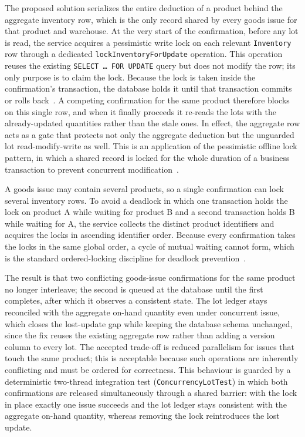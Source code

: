 The proposed solution serializes the entire deduction of a product behind the
aggregate inventory row, which is the only record shared by every goods issue
for that product and warehouse. At the very start of the confirmation, before
any lot is read, the service acquires a pessimistic write lock on each
relevant \texttt{Inventory} row through a dedicated
\texttt{lockInventoryForUpdate} operation. This operation reuses the existing
\texttt{SELECT~\dots~FOR~UPDATE} query but does not modify the row; its only
purpose is to claim the lock. Because the lock is taken inside the
confirmation's transaction, the database holds it until that transaction
commits or rolls back~\cite{postgresql14}. A competing confirmation for the
same product therefore blocks on this single row, and when it finally proceeds
it re-reads the lots with the already-updated quantities rather than the stale
ones. In effect, the aggregate row acts as a gate that protects not only the
aggregate deduction but the unguarded lot read-modify-write as well. This is an
application of the pessimistic offline lock pattern, in which a shared record is
locked for the whole duration of a business transaction to prevent concurrent
modification~\cite{fowler2002poeaa, bauer2015hibernate}.

A goods issue may contain several products, so a single confirmation can lock
several inventory rows. To avoid a deadlock in which one transaction holds the
lock on product A while waiting for product B and a second transaction holds B
while waiting for A, the service collects the distinct product identifiers and
acquires the locks in ascending identifier order. Because every confirmation
takes the locks in the same global order, a cycle of mutual waiting cannot
form, which is the standard ordered-locking discipline for deadlock
prevention~\cite{fowler2002poeaa}.

The result is that two conflicting goods-issue confirmations for the same
product no longer interleave; the second is queued at the database until the
first completes, after which it observes a consistent state. The lot ledger
stays reconciled with the aggregate on-hand quantity even under concurrent
issue, which closes the lost-update gap while keeping the database schema
unchanged, since the fix reuses the existing aggregate row rather than adding a
version column to every lot. The accepted trade-off is reduced parallelism for
issues that touch the same product; this is acceptable because such operations
are inherently conflicting and must be ordered for correctness. This behaviour
is guarded by a deterministic two-thread integration test
(\texttt{ConcurrencyLotTest}) in which both confirmations are released
simultaneously through a shared barrier: with the lock in place exactly one
issue succeeds and the lot ledger stays consistent with the aggregate on-hand
quantity, whereas removing the lock reintroduces the lost update.

